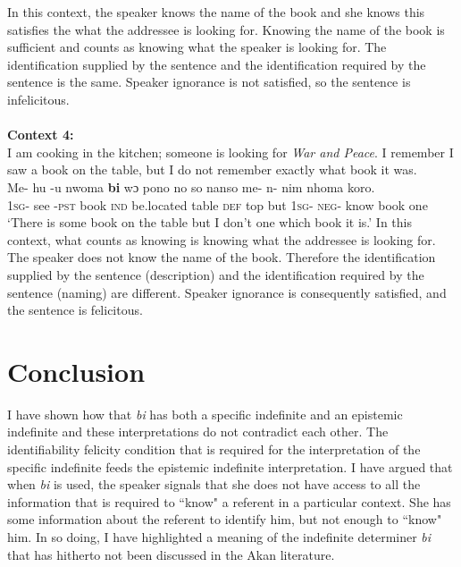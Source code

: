 \documentclass[output=paper,modfonts,nonflat,draftmode]{langsci/langscibook}
\begin{document}
 \z In this context, the speaker knows the name of the book and she knows this satisfies the what the addressee is looking for. Knowing the name of the book is sufficient and counts as knowing what the speaker is looking for. The identification supplied by the sentence and the identification required by the sentence is the same. Speaker ignorance is not satisfied, so the sentence is infelicitous.  \\\\
\textbf{Context 4:} \\
I am cooking in the kitchen; someone is looking for \emph{War and Peace}. I remember I saw a book on the table, but I do not remember exactly what book it was.
\ea\label{owusu:ex62}\\
\gll Me- hu -u nwoma \textbf{bi} wɔ pono no so nanso me- n- nim nhoma koro.\\
	     \textsc{1sg}- see -\textsc{pst}  book \textsc{ind}  be.located table \textsc{def} top but \textsc{1sg}- \textsc{neg}- know book one\\

\glt `There is some book on the table but I don't one which book it is.'
\z In this context, what counts as knowing is knowing what the addressee is looking for. The speaker does not know the name of the book. Therefore the identification supplied by the sentence (description) and the identification required by the sentence (naming) are different. Speaker ignorance is consequently satisfied, and the sentence is felicitous. 

\section{Conclusion}

I have shown how that \emph{bi} has both a  specific indefinite and an epistemic indefinite and these interpretations do not contradict each other. The identifiability felicity condition that is required for the interpretation of the specific indefinite feeds the epistemic indefinite interpretation. I have argued that when \emph{bi} is used, the speaker signals that she does not have access to all the information that is required to ``know" a referent in a particular context. She has some information about the referent to identify him, but not enough to ``know" him. In so doing, I have highlighted a meaning of the indefinite determiner \emph{bi} that has hitherto not been discussed in the Akan literature. 
 
\end{document}
